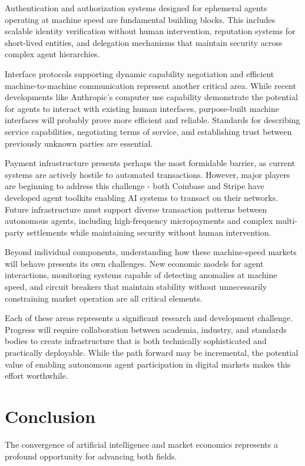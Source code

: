 \documentclass{article}
\begin{document}
Authentication and authorization systems designed for ephemeral agents operating at machine speed are fundamental building blocks. This includes scalable identity verification without human intervention, reputation systems for short-lived entities, and delegation mechanisms that maintain security across complex agent hierarchies.

Interface protocols supporting dynamic capability negotiation and efficient machine-to-machine communication represent another critical area. While recent developments like Anthropic's computer use capability demonstrate the potential for agents to interact with existing human interfaces, purpose-built machine interfaces will probably prove more efficient and reliable. Standards for describing service capabilities, negotiating terms of service, and establishing trust between previously unknown parties are essential.

Payment infrastructure presents perhaps the most formidable barrier, as current systems are actively hostile to automated transactions. However, major players are beginning to address this challenge - both Coinbase and Stripe have developed agent toolkits enabling AI systems to transact on their networks. Future infrastructure must support diverse transaction patterns between autonomous agents, including high-frequency micropayments and complex multi-party settlements while maintaining security without human intervention.

Beyond individual components, understanding how these machine-speed markets will behave presents its own challenges. New economic models for agent interactions, monitoring systems capable of detecting anomalies at machine speed, and circuit breakers that maintain stability without unnecessarily constraining market operation are all critical elements.

Each of these areas represents a significant research and development challenge. Progress will require collaboration between academia, industry, and standards bodies to create infrastructure that is both technically sophisticated and practically deployable. While the path forward may be incremental, the potential value of enabling autonomous agent participation in digital markets makes this effort worthwhile.
 

\section{Conclusion}
The convergence of artificial intelligence and market economics represents a profound opportunity for advancing both fields.
\end{document}
